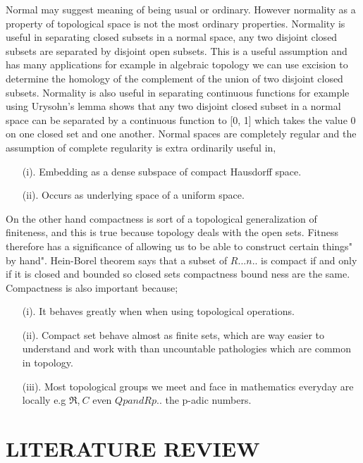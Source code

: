 \documentclass[PhD,14,a4paper]{report}
\theoremstyle{plain}
\theoremstyle{definition}
\theoremstyle{remark}
\numberwithin{figure}{section}
\numberwithin{equation}{subsection}
\begin{document}
{Normal may suggest meaning of being usual or ordinary. However normality as a property of topological space is not the most ordinary properties. Normality is useful in separating closed subsets in a normal space, any two disjoint closed subsets are separated by disjoint open subsets. This is a useful assumption and has many applications for example in algebraic topology we can use excision to determine the homology of the complement of the union of two disjoint closed subsets. Normality is also useful in separating continuous functions for example using Urysohn's lemma shows that any two disjoint closed subset in a normal space can be separated by a continuous function to [0, 1] which takes the value 0 on one closed set and one another. Normal spaces are completely regular and the assumption of complete regularity is extra ordinarily useful in,
\begin{itemize}
\item [(i).] Embedding as a dense subspace of compact Hausdorff space.
\item [(ii).] Occurs as underlying space of a uniform space.
\end{itemize}
On the other hand compactness is sort of a topological generalization of finiteness, and this is true because topology deals with the open sets. Fitness therefore has a significance of allowing us to be able to construct certain things" by hand". Hein-Borel theorem says that a subset of $R...n..$ is compact if and only if it is closed and bounded so closed sets compactness bound ness are the same. Compactness is also important because;
\begin{itemize}
\item [(i).] It behaves greatly when when using topological operations.
\item [(ii).] Compact set behave almost as finite sets, which are way easier to understand and work with than uncountable pathologies which are common in topology.
\item [(iii).] Most topological groups we meet and face in mathematics everyday are locally e.g $\Re $,$\ C$ even $Qp and Rp.. $ the p-adic numbers.
\end{itemize}


\chapter{LITERATURE REVIEW}
}
\end{document}
